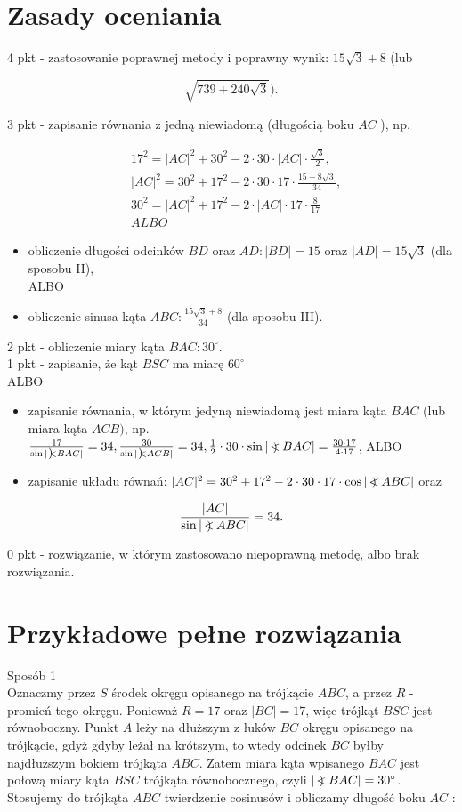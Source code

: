 \documentclass[10pt]{article}
\newcommand\Varangle{\mathop{{<\!\!\!\!\!\text{\small)}}\:}\nolimits}
\begin{document}
\section*{Zasady oceniania}
4 pkt - zastosowanie poprawnej metody i poprawny wynik: $15 \sqrt{3}+8$ (lub

$$
\sqrt{739+240 \sqrt{3}}) .
$$

3 pkt - zapisanie równania z jedną niewiadomą (długością boku $A C$ ), np.

$$
\begin{aligned}
& 17^{2}=|A C|^{2}+30^{2}-2 \cdot 30 \cdot|A C| \cdot \frac{\sqrt{3}}{2}, \\
& |A C|^{2}=30^{2}+17^{2}-2 \cdot 30 \cdot 17 \cdot \frac{15-8 \sqrt{3}}{34}, \\
& 30^{2}=|A C|^{2}+17^{2}-2 \cdot|A C| \cdot 17 \cdot \frac{8}{17} \\
& A L B O
\end{aligned}
$$

\begin{itemize}
  \item obliczenie długości odcinków $B D$ oraz $A D:|B D|=15$ oraz $|A D|=15 \sqrt{3}$ (dla sposobu II),\\
ALBO
  \item obliczenie sinusa kąta $A B C: \frac{15 \sqrt{3}+8}{34}$ (dla sposobu III).
\end{itemize}

2 pkt - obliczenie miary kąta $B A C: 30^{\circ}$.\\
1 pkt - zapisanie, że kąt $B S C$ ma miarę $60^{\circ}$\\
ALBO

\begin{itemize}
  \item zapisanie równania, w którym jedyną niewiadomą jest miara kąta $B A C$ (lub miara kąta $A C B)$, np. $\frac{17}{\sin |\Varangle B A C|}=34, \frac{30}{\sin |\Varangle A C B|}=34, \frac{1}{2} \cdot 30 \cdot \sin |\Varangle B A C|=\frac{30 \cdot 17}{4 \cdot 17}$, ALBO
  \item zapisanie układu równań: $|A C|^{2}=30^{2}+17^{2}-2 \cdot 30 \cdot 17 \cdot \cos |\Varangle A B C|$ oraz
\end{itemize}

$$
\frac{|A C|}{\sin |\Varangle A B C|}=34 .
$$

0 pkt - rozwiązanie, w którym zastosowano niepoprawną metodę, albo brak rozwiązania.

\section*{Przykładowe pełne rozwiązania}
Sposób 1\\
Oznaczmy przez $S$ środek okręgu opisanego na trójkącie $A B C$, a przez $R$ - promień tego okręgu. Ponieważ $R=17$ oraz $|B C|=17$, więc trójkąt $B S C$ jest równoboczny. Punkt $A$ leży na dłuższym z łuków $B C$ okręgu opisanego na trójkącie, gdyż gdyby leżał na krótszym, to wtedy odcinek $B C$ byłby najdłuższym bokiem trójkąta $A B C$. Zatem miara kąta wpisanego $B A C$ jest połową miary kąta $B S C$ trójkąta równobocznego, czyli $|\Varangle B A C|=30^{\circ}$. Stosujemy do trójkąta $A B C$ twierdzenie cosinusów i obliczamy długość boku $A C$ :
\end{document}

